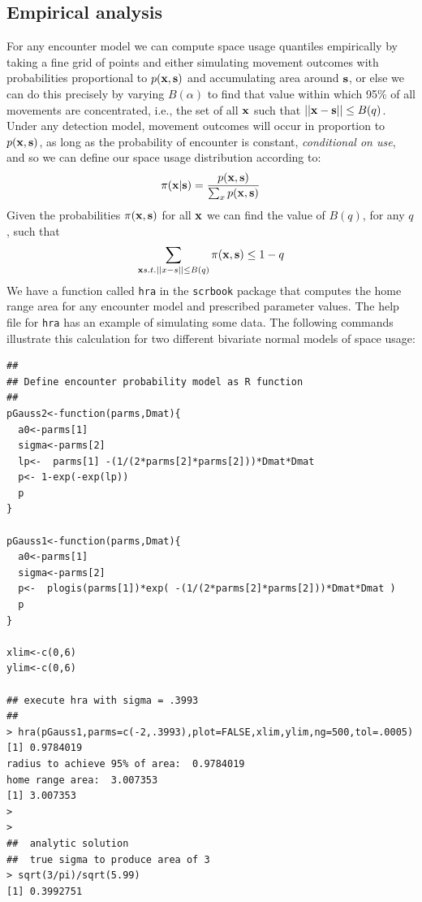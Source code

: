 \subsection{Empirical analysis}

For any encounter model we can compute space usage quantiles
empirically by taking a fine grid of points and either simulating
movement outcomes with probabilities proportional to $p({\bf x},{\bf s})$ and
accumulating area around ${\bf s}$, or else we can do this precisely
by varying $B(\alpha)$ to find that value within which 95\% of all
movements are concentrated, i.e., the set of all ${\bf x}$ such that
$||{\bf x}-{\bf s}|| \le B(q)$.  Under any detection model,
  movement outcomes will occur in proportion to $p({\bf x},{\bf s})$,
  as long as the probability of encounter is constant, {\it
    conditional on use}, and so we can define our space usage
  distribution according to:
\[
 \pi({\bf x}|{\bf s}) =\frac{p({\bf x},{\bf s})}{\sum_{x} p({\bf
     x},{\bf s}) }
\]
Given the probabilities $\pi({\bf x},{\bf s})$ for all ${\bf x}$ we
can find the value of $B(q)$, for any $q$, such that
\[
\sum_{{\bf x}
  s.t. ||x-s|| \le B(q) } \pi({\bf x},{\bf s}) \le 1-q
\]
We have a function called \mbox{\tt hra} in the \mbox{\tt scrbook}
package that computes the home range area for any encounter model and
prescribed parameter values. The help file for \mbox{\tt hra} has an
example of simulating some data.  The following commands illustrate
this calculation for two different bivariate normal models of space
usage: 
{\small
\begin{verbatim}
##
## Define encounter probability model as R function
##
pGauss2<-function(parms,Dmat){
  a0<-parms[1]
  sigma<-parms[2]
  lp<-  parms[1] -(1/(2*parms[2]*parms[2]))*Dmat*Dmat
  p<- 1-exp(-exp(lp))
  p
}

pGauss1<-function(parms,Dmat){
  a0<-parms[1]
  sigma<-parms[2]
  p<-  plogis(parms[1])*exp( -(1/(2*parms[2]*parms[2]))*Dmat*Dmat )
  p
}

xlim<-c(0,6)
ylim<-c(0,6)

## execute hra with sigma = .3993
##
> hra(pGauss1,parms=c(-2,.3993),plot=FALSE,xlim,ylim,ng=500,tol=.0005)
[1] 0.9784019
radius to achieve 95% of area:  0.9784019
home range area:  3.007353
[1] 3.007353
>
>
##  analytic solution
##  true sigma to produce area of 3
> sqrt(3/pi)/sqrt(5.99)
[1] 0.3992751
\end{verbatim}
}
